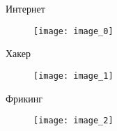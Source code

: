 \begin{frame}{Интернет}
	\begin{figure}[h!]
	\centering
	\texttt{[image: image\_0]}
\end{figure}
\end{frame}

\begin{frame}{Хакер}
	\begin{figure}[h!]
	\centering
	\texttt{[image: image\_1]}
\end{figure}
\end{frame}

\begin{frame}{Фрикинг}
	\begin{figure}[h!]
	\centering
	\texttt{[image: image\_2]}
\end{figure}
\end{frame}

